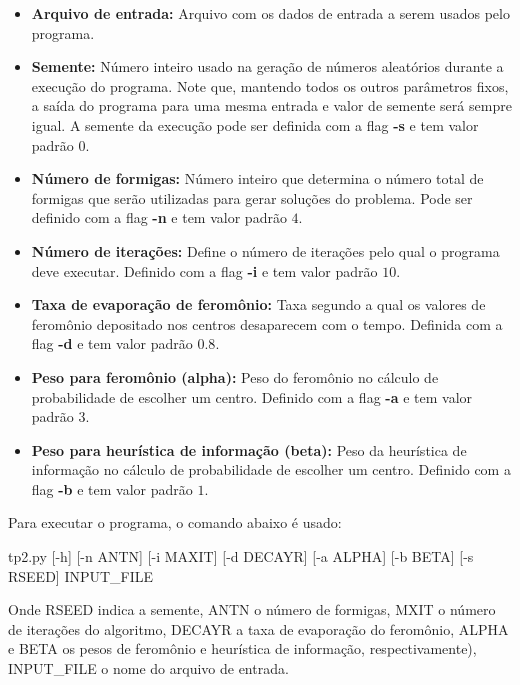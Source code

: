 \documentclass[12pt]{article}
\begin{document}
\begin{itemize}
 \item \textbf{Arquivo de entrada:} Arquivo com os dados de entrada a serem usados pelo programa.
 
 \item \textbf{Semente:} Número inteiro usado na geração de números aleatórios durante a 
 execução do programa. Note que, mantendo todos os outros parâmetros fixos, a saída
 do programa para uma mesma entrada e valor de semente será sempre igual. A semente
 da execução pode ser definida com a flag \textbf{-s} e tem valor padrão $ 0 $.
 
 \item \textbf{Número de formigas:} Número inteiro que determina o número total de formigas
 que serão utilizadas para gerar soluções do problema. Pode ser definido com a flag \textbf{-n}
 e tem valor padrão $ 4 $.
  
 \item \textbf{Número de iterações:} Define o número de iterações pelo qual o programa
 deve executar. Definido com a flag \textbf{-i} e tem valor padrão $ 10 $.
 
 \item \textbf{Taxa de evaporação de feromônio:} Taxa segundo a qual os valores de feromônio
 depositado nos centros desaparecem com o tempo. Definida com a flag \textbf{-d} e tem valor
 padrão $ 0.8 $.
 
 \item \textbf{Peso para feromônio (alpha):} Peso do feromônio no cálculo de probabilidade de escolher 
 um centro. Definido com a flag \textbf{-a} e tem valor padrão $ 3 $.
 
 \item \textbf{Peso para heurística de informação (beta):} Peso da heurística de informação no cálculo
 de probabilidade de escolher um centro. Definido com a flag \textbf{-b} e tem valor padrão $ 1 $.
\end{itemize}

Para executar o programa, o comando abaixo é usado:

\begin{center}
tp2.py [-h] [-n ANTN] [-i MAXIT] [-d DECAYR] [-a ALPHA] [-b BETA]
              [-s RSEED]
              INPUT\_FILE
\end{center}

Onde RSEED indica a semente, ANTN o número de formigas, MXIT o número de iterações do algoritmo,
DECAYR a taxa de evaporação do feromônio, ALPHA e BETA os pesos de feromônio e heurística de informação, 
respectivamente), INPUT\_FILE o nome do arquivo de entrada.
\end{document}

